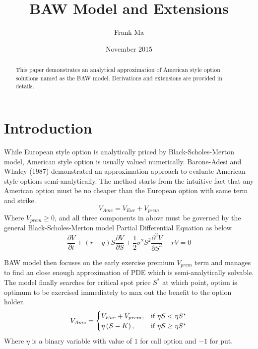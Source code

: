 \documentclass{article}
\title{BAW Model and Extensions}
\author{Frank Ma}
\date{November 2015}
\begin{document}
\maketitle

\begin{abstract}
    This paper demonstrates an analytical approximation of American style option solutions named as the BAW model.
    Derivations and extensions are provided in details.
\end{abstract}


\section{Introduction}

While European style option is analytically priced by Black-Scholes-Merton model, American style option is usually valued numerically. 
Barone-Adesi and Whaley (1987) demonstrated an approximation approach to evaluate American style options semi-analytically. 
The method starts from the intuitive fact that any American option must be no cheaper than the European option with same term and strike.
\begin{equation}
    V_{Ame} = V_{Eur} + V_{prem}
\end{equation}
Where $ V_{prem} \geq 0 $, and all three components in above must be governed by the general Black-Scholes-Merton model Partial Differential Equation as below 
\begin{equation}
    \frac{\partial V}{\partial t} + \left(r - q\right) S \frac{\partial V}{\partial S} + \frac{1}{2} \sigma^2 S^2 \frac{\partial^2 V}{\partial S^2} - r V = 0
\end{equation}

BAW model then focuses on the early exercise premium $ V_{prem} $ term and manages to find an close enough approximation of PDE which is semi-analytically solvable.
The model finally searches for critical spot price $ S^* $ at which point, option is optimum to be exercised immediately to max out the benefit to the option holder.
\begin{equation} \label{BAW formula}
    V_{Ame} = 
    \begin{cases} 
        V_{Eur} + V_{prem}, & \mbox{if $ \eta S < \eta S^* $} \\
        \eta \left(S - K\right), & \mbox{if $ \eta S \geq \eta S^* $}
    \end{cases}
\end{equation}
Where $ \eta $ is a binary variable with value of $ 1 $ for call option and $ -1 $ for put.
\end{document}
